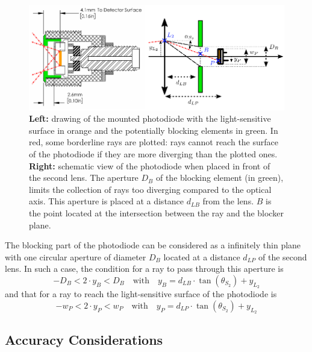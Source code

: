 \begin{figure}
	\centering
	\includegraphics{2_appendices/optical_figures/pd_aperture_converted.pdf}
	\caption[Drawing and schematic view of the mounted photodiode.]{\textbf{Left:} drawing of the mounted photodiode with the light-sensitive surface in orange and the potentially blocking elements in green. In red, some borderline rays are plotted: rays cannot reach the surface of the photodiode if they are more diverging than the plotted ones. \textbf{Right:} schematic view of the photodiode when placed in front of the second lens. The aperture $D_B$ of the blocking element (in green), limits the collection of rays too diverging compared to the optical axis. This aperture is placed at a distance $d_{LB}$ from the lens. $B$ is the point located at the intersection between the ray and the blocker plane.}
	\label{anfig:optics:collecting_pd_cond}
\end{figure}

The blocking part of the photodiode can be considered as a infinitely thin plane with one circular aperture of diameter $D_B$ located at a distance $d_{LP}$ of the second lens. In such a case, the condition for a ray to pass through this aperture is
\begin{equation}
	-D_B < 2 \cdot y_B < D_B \quad \text{with} \quad y_B = d_{LB} \cdot \tan( \theta_{S_2} ) + y_{L_2}
\end{equation}
and that for a ray to reach the light-sensitive surface of the photodiode is
\begin{equation}
	-w_P < 2 \cdot y_P < w_P \quad \text{with} \quad y_P = d_{LP} \cdot \tan( \theta_{S_2} ) + y_{L_2}
\end{equation}

\subsection{Accuracy Considerations}\label{ansect:optics:accuracy}

